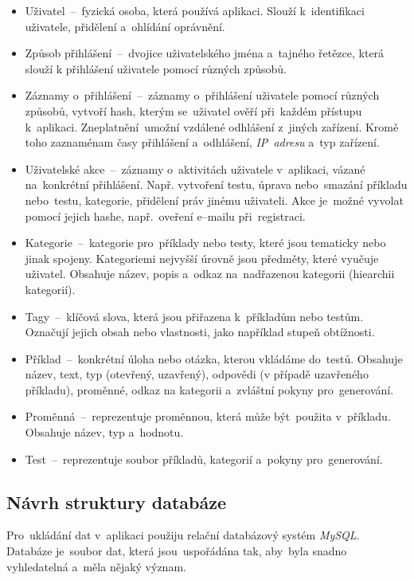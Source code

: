 \documentclass[10pt,a4paper]{article}
\begin{document}
                \begin{itemize}
                    \item Uživatel~--~fyzická osoba, která používá aplikaci. Slouží k~identifikaci uživatele, přidělení a~ohlídání oprávnění.
                    \item Způsob přihlášení~--~dvojice uživatelského jména a~tajného řetězce, která slouží k přihlášení uživatele pomocí různých způsobů.
                    \item Záznamy o~přihlášení~--~záznamy o~přihlášení uživatele pomocí různých způsobů, vytvoří hash, kterým se~uživatel ověří při~každém přístupu k~aplikaci. Zneplatnění~umožní vzdálené odhlášení z~jiných zařízení. Kromě toho zaznaménam časy přihlášení a~odhlášení, \emph{IP~adresu} a~typ zařízení.
                    \item Uživatelské akce~--~záznamy o~aktivitách uživatele v~aplikaci, vázané na~konkrétní přihlášení. Např. vytvoření testu, úprava nebo~smazání příkladu nebo~testu, kategorie, přidělení práv jinému uživateli. Akce je~možné vyvolat pomocí jejich hashe, např.~oveření e--mailu při~registraci.
                    \item Kategorie~--~kategorie pro~příklady nebo testy, které jsou tematicky nebo jinak spojeny. Kategoriemi nejvyšší úrovně jsou předměty, které vyučuje uživatel. Obsahuje název, popis a~odkaz na~nadřazenou kategorii (hiearchii kategorií).
                    \item Tagy~--~klíčová slova, která jsou přiřazena k~příkladům nebo testům. Označují jejich obsah nebo vlastnosti, jako například stupeň obtížnosti.
                    \item Příklad~--~konkrétní úloha nebo otázka, kterou vkládáme do~testů. Obsahuje název, text, typ (otevřený, uzavřený), odpovědi (v případě uzavřeného příkladu), proměnné, odkaz na kategorii a~zvláštní pokyny pro~generování.
                    \item Proměnná~--~reprezentuje proměnnou, která může být~použita v~příkladu. Obsahuje název, typ a~hodnotu.
                    \item Test~--~reprezentuje soubor příkladů, kategorií a~pokyny pro~generování.
                \end{itemize}


        \subsection{Návrh struktury databáze}
            Pro~ukládání dat v~aplikaci použiju relační databázový systém \emph{MySQL}. Databáze je~soubor dat, která jsou~uspořádána tak, aby~byla snadno vyhledatelná a~měla nějaký význam.
\end{document}
